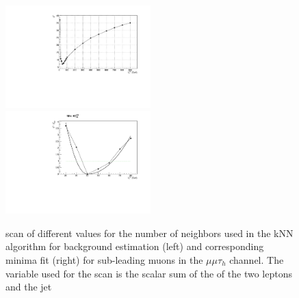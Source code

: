 \begin{figure}
\includegraphics[width=0.5\textwidth]{4_Analisys/pics/8TeV/ProfileNeighbors/MM/h2taucuts020/LT_chi2.pdf}
\includegraphics[width=0.5\textwidth]{4_Analisys/pics/8TeV/ProfileNeighbors/MM/h2taucuts020_LT.pdf} \\
\caption{\chisq scan of different %
values for the number of neighbors used in the kNN algorithm for background estimation 
(left) and corresponding minima fit (right) for sub-leading muons in the $\mu\mu\tau_h$ channel. The variable used for the scan is the scalar sum of the \pT of the two leptons and the jet}
\label{fig:kNN_minima_sample}
\end{figure}


